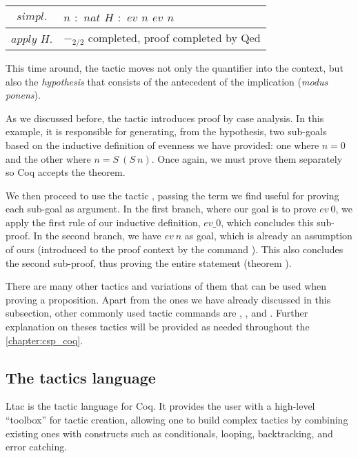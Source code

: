 \begin{longtable}{| S | P |}
	\hline
	 & $n$$ $ $ : $ $ nat$\linebreak
	$H$$ $ $ : $ $ ev $ $ n$\linebreak
	\fracrule\linebreak
	$ev $ $ n$\\

	\hline
	$apply $ $ H.$ & $-_{2/2}$ completed, proof completed by Qed \label{Proofs:coq-example:Theorem:ev-minus2} \\
	\hline
\end{longtable}

This time around, the tactic  moves not only the quantifier into the context, but also the \emph{hypothesis} that consists of the antecedent of the implication (\emph{modus ponens}).

As we discussed before, the tactic  introduces proof by case analysis. In this example, it is responsible for generating, from the hypothesis, two sub-goals based on the inductive definition of evenness we have provided: one where $ n = 0 $ and the other where $ n = S \ (S \ n) $. Once again, we must prove them separately so Coq accepts the theorem.

We then proceed to use the tactic , passing the term we find useful for proving each sub-goal as argument. In the first branch, where our goal is to prove $ ev \ 0 $, we apply the first rule of our inductive definition, $ ev\_0 $, which concludes this sub-proof. In the second branch, we have $ ev \ n $ as goal, which is already an assumption of ours (introduced to the proof context by the command ). This also concludes the second sub-proof, thus proving the entire statement (theorem ).

There are many other tactics and variations of them that can be used when proving a proposition. Apart from the ones we have already discussed in this subsection, other commonly used tactic commands are , , and . Further explanation on theses tactics will be provided as needed throughout the \autoref{chapter:csp_coq}.

\subsection{The tactics language}

Ltac is the tactic language for Coq. It provides the user with a high-level ``toolbox''  for tactic creation, allowing one to build complex tactics by combining existing ones with constructs such as conditionals, looping, backtracking, and error catching.

